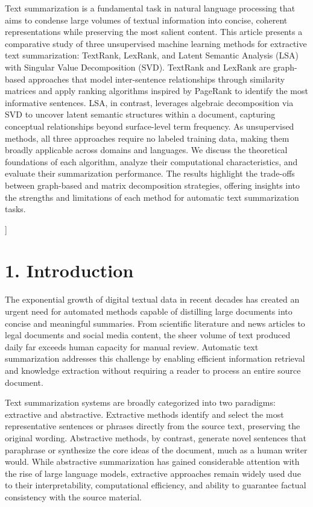\documentclass[10pt]{book}
\begin{document}
\begin{center}
{Text summarization is a fundamental task in natural language processing that aims to condense large volumes of 
textual information into concise, coherent representations while preserving the most salient content. This article 
presents a comparative study of three unsupervised machine learning methods for extractive text summarization: 
TextRank, LexRank, and Latent Semantic Analysis (LSA) with Singular Value Decomposition (SVD). TextRank and 
LexRank are graph-based approaches that model inter-sentence relationships through similarity matrices and 
apply ranking algorithms inspired by PageRank to identify the most informative sentences. LSA, in contrast, 
leverages algebraic decomposition via SVD to uncover latent semantic structures within a document, capturing 
conceptual relationships beyond surface-level term frequency. As unsupervised methods, all three approaches 
require no labeled training data, making them broadly applicable across domains and languages. We discuss the 
theoretical foundations of each algorithm, analyze their computational characteristics, and evaluate their summarization 
performance. The results highlight the trade-offs between graph-based and matrix decomposition strategies, 
offering insights into the strengths and limitations of each method for automatic text summarization tasks.}
\end{center}

\bigskip
] \markboth{}{}

\section{1. Introduction }

The exponential growth of digital textual data in recent decades has created an urgent need for automated methods capable of distilling large documents into concise and meaningful summaries. From scientific literature and news articles to legal documents and social media content, the sheer volume of text produced daily far exceeds human capacity for manual review. Automatic text summarization addresses this challenge by enabling efficient information retrieval and knowledge extraction without requiring a reader to process an entire source document.

Text summarization systems are broadly categorized into two paradigms: extractive and abstractive. Extractive methods identify and select the most representative sentences or phrases directly from the source text, preserving the original wording. Abstractive methods, by contrast, generate novel sentences that paraphrase or synthesize the core ideas of the document, much as a human writer would. While abstractive summarization has gained considerable attention with the rise of large language models, extractive approaches remain widely used due to their interpretability, computational efficiency, and ability to guarantee factual consistency with the source material.
\end{document}
